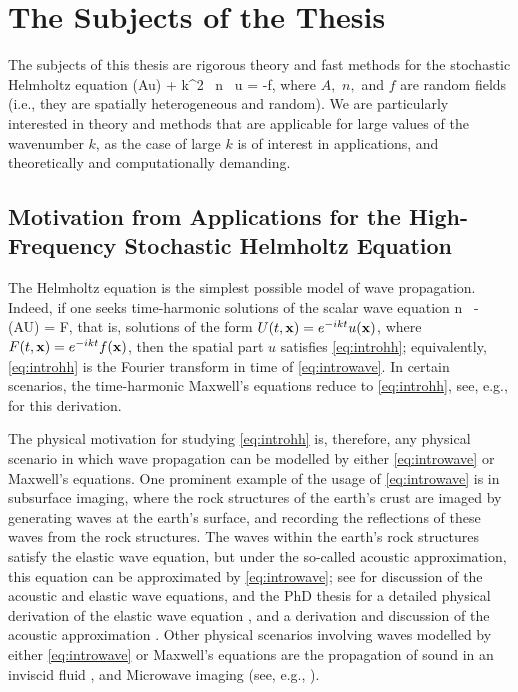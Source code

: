 \section{The Subjects of the Thesis}
The subjects of this thesis are rigorous theory and fast methods for the stochastic Helmholtz equation
\beq\label{eq:introhh}
\grad \cdot \mleft(A\grad u\mright) + k^2 \, n \, u = -f,
\eeq
where $A,$ $n,$ and $f$ are random fields (i.e., they are spatially heterogeneous and random). We are particularly interested in theory and methods that are applicable for large values of the wavenumber $k$, as the case of large $k$ is of interest in applications, and theoretically and computationally demanding.

\subsection{Motivation from Applications for the High-Frequency Stochastic Helmholtz Equation}\label{sec:motivapp}

The Helmholtz equation is the simplest possible model of wave propagation. Indeed, if one seeks time-harmonic solutions of the scalar wave equation
\beq\label{eq:introwave}
n \,  - \grad \cdot\mleft(A\grad U\mright) = F,
\eeq
that is, solutions of the form $U(t,\mathbf{x}) = e^{-ikt}u(\mathbf{x})$, where $F(t,\mathbf{x}) = e^{-ikt}f(\mathbf{x})$, then the spatial part $u$ satisfies \eqref{eq:introhh}; equivalently, \eqref{eq:introhh} is the Fourier transform in time  of \eqref{eq:introwave}. In certain scenarios, the time-harmonic Maxwell's equations reduce to \eqref{eq:introhh}, see, e.g., \cite[Remark 2.1]{MoSp:19} for this derivation.

The physical motivation for studying \eqref{eq:introhh} is, therefore, any physical scenario in which wave propagation can be modelled by either \eqref{eq:introwave} or Maxwell's equations. One prominent example of the usage of \eqref{eq:introwave} is in subsurface imaging, where the rock structures of the earth's crust are imaged by generating waves at the earth's surface, and recording the reflections of these waves from the rock structures. The waves within the earth's rock structures satisfy the elastic wave equation, but under the so-called acoustic approximation, this equation can be approximated by \eqref{eq:introwave}; see \cite[Sections 1.1 and 1.2]{Ih:98} for discussion of the acoustic and elastic wave equations, and the PhD thesis \cite{Ch:15} for a detailed physical derivation of the elastic wave equation \cite[Section 1.2]{Ch:15}, and a derivation and discussion of the acoustic approximation \cite[Section 1.2.6]{Ch:15}. Other physical scenarios involving waves modelled by either \eqref{eq:introwave} or Maxwell's equations are the propagation of sound in an inviscid fluid \cite[Section 2.1]{CoKr:13}, and Microwave imaging (see, e.g., \cite[Section 6.4]{BoDoGrSpTo:19}).

